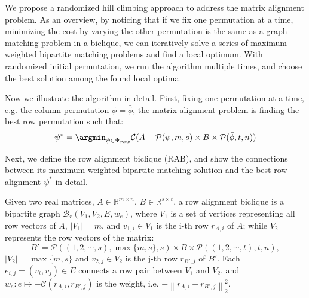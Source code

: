 \documentclass[conference]{IEEEtran}
\begin{document}
{%




We propose a randomized hill climbing approach to address the matrix alignment problem. As an overview, by noticing that if we fix one permutation at a time, minimizing the cost by varying the other permutation is the same as a graph matching problem in a biclique, we can iteratively solve a series of maximum weighted bipartite matching problems and find a local optimum. With randomized initial permutation, we run the algorithm multiple times, and choose the best solution among the found local optima. 


Now we illustrate the algorithm in detail. First, fixing one permutation at a time, e.g. the column permutation $\phi = \bar \phi$, the matrix alignment problem is finding the best row permutation such that: 
\begin{displaymath}
\psi^* = \argmin_{\psi \in \Psi_{row}} \mathcal{C}(A - \mathcal{P}(\psi,m,s)\times B \times \mathcal{P}(\bar \phi,t,n))
\end{displaymath}


Next, we define the row alignment biclique (RAB), and show the connections between its maximum weighted bipartite matching solution and the best row alignment $\psi^*$ in detail. 


\begin{definition} 
Given two real matrices, $A \in \mathbb{R}^{m\times n}$, $B \in \mathbb{R}^{s \times t}$, a row alignment biclique is a bipartite graph $\mathcal{B}_r(V_1, V_2, E, w_e)$, where $V_1$ is a set of vertices representing all row vectors of $A$, $|V_1| = m$, and $v_{1,i} \in V_1$ is the i-{th} row $r_{A,i}$ of $A$; while $V_2$ represents the row vectors of the matrix:
\begin{displaymath}
B' = \mathcal{P}((1,2,\cdots,s), \max\{m,s\}, s)\times B\times \mathcal{P}((1,2,\cdots,t), t,n),
\end{displaymath}
$|V_2| = \max\{m,s\}$ and $v_{2,j} \in V_2$ is the j-{th} row $r_{B',j}$ of $B'$. Each $e_{i,j} = (v_i, v_j) \in E$ connects a row pair between $V_1$ and $V_2$, and $w_e: e \mapsto - \mathcal{C}(r_{A,i}, r_{B',j})$ is the weight, i.e. $- \left\|r_{A,i} - r_{B',j}\right\|_2^2$. 
\end{definition}


}
\end{document}
